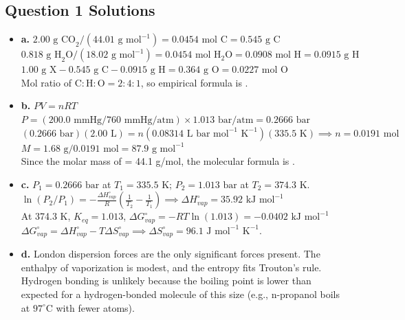 \documentclass[11pt,letterpaper]{article}
\begin{document}
\subsection*{Question 1 Solutions}
\begin{itemize}[leftmargin=*]
    \item \textbf{a.} 
    $2.00\text{ g CO}_2 / (44.01\text{ g mol}^{-1}) = 0.0454\text{ mol C} = 0.545\text{ g C}$ \\
    $0.818\text{ g H}_2\text{O} / (18.02\text{ g mol}^{-1}) = 0.0454\text{ mol H}_2\text{O} = 0.0908\text{ mol H} = 0.0915\text{ g H}$ \\
    $1.00\text{ g X} - 0.545\text{ g C} - 0.0915\text{ g H} = 0.364\text{ g O} = 0.0227\text{ mol O}$ \\
    Mol ratio of $\text{C}:\text{H}:\text{O} = 2:4:1$, so empirical formula is .
    
    \item \textbf{b.} 
    $PV = nRT$ \\
    $P = (200.0\text{ mmHg} / 760\text{ mmHg/atm}) \times 1.013\text{ bar/atm} = 0.2666\text{ bar}$ \\
    $(0.2666\text{ bar})(2.00\text{ L}) = n(0.08314\text{ L bar mol}^{-1}\text{ K}^{-1})(335.5\text{ K}) \implies n = 0.0191\text{ mol}$ \\
    $M = 1.68\text{ g} / 0.0191\text{ mol} = 87.9\text{ g mol}^{-1}$ \\
    Since the molar mass of  = 44.1 g/mol, the molecular formula is .
    
    \item \textbf{c.} 
    $P_1 = 0.2666\text{ bar}$ at $T_1 = 335.5\text{ K}$; $P_2 = 1.013\text{ bar}$ at $T_2 = 374.3\text{ K}$. \\
    $\ln(P_2/P_1) = -\frac{\Delta H^\circ_{vap}}{R}\left(\frac{1}{T_2} - \frac{1}{T_1}\right) \implies \Delta H^\circ_{vap} = 35.92\text{ kJ mol}^{-1}$ \\
    At 374.3 K, $K_{eq} = 1.013$, $\Delta G^\circ_{vap} = -RT\ln(1.013) = -0.0402\text{ kJ mol}^{-1}$ \\
    $\Delta G^\circ_{vap} = \Delta H^\circ_{vap} - T\Delta S^\circ_{vap} \implies \Delta S^\circ_{vap} = 96.1\text{ J mol}^{-1}\text{ K}^{-1}$.
    
    \item \textbf{d.} 
    London dispersion forces are the only significant forces present. The enthalpy of vaporization is modest, and the entropy fits Trouton's rule. Hydrogen bonding is unlikely because the boiling point is lower than expected for a hydrogen-bonded molecule of this size (e.g., n-propanol boils at $97^{\circ}\text{C}$ with fewer atoms).
    

\end{itemize}
\end{document}
